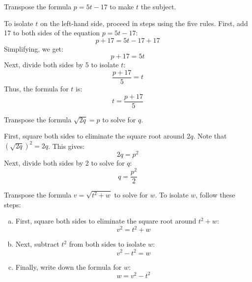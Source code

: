 \begin{example} Transpose the formula \(p = 5t - 17\) to make \(t\) the subject.

\begin{solution}
 To isolate \(t\) on the left-hand side, proceed in steps using the five rules. First, add 17 to both sides of the equation \(p = 5t - 17\):
\[
p + 17 = 5t - 17 + 17
\]
Simplifying, we get:
\[
p + 17 = 5t
\]
Next, divide both sides by 5 to isolate \(t\):
\[
\frac{p + 17}{5} = t
\]
Thus, the formula for \(t\) is:
\[
t = \frac{p + 17}{5}
\]   
\end{solution}    
\end{example}

\begin{example} Transpose the formula \(\sqrt{2q} = p\) to solve for \(q\).

\begin{solution}
   First, square both sides to eliminate the square root around \(2q\). Note that \((\sqrt{2q})^2 = 2q\). This gives:
\[
2q = p^2
\]
Next, divide both sides by 2 to solve for \(q\):
\[
q = \frac{p^2}{2}
\]   
\end{solution}
 
\end{example}

\newpage

\begin{example}
Transpose the formula \(v = \sqrt{t^2 + w}\) to solve for \(w\). To isolate \(w\), follow these steps:   

\begin{solution}
    \begin{enumerate}[a.]
        \item First, square both sides to eliminate the square root around \(t^2 + w\):
        \[
        v^2 = t^2 + w
        \]

        \item Next, subtract \(t^2\) from both sides to isolate \(w\):
        \[
        v^2 - t^2 = w
        \]

        \item Finally, write down the formula for \(w\):
        \[
        w = v^2 - t^2
        \]
    \end{enumerate}

    \end{solution}
\end{example}

